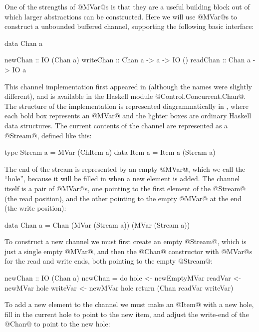 
One of the strengths of @MVar@s is that they are a useful building
block out of which larger abstractions can be constructed.  Here we
will use @MVar@s to construct a unbounded buffered channel, supporting
the following basic interface:

\begin{haskell}
data Chan a

newChan   :: IO (Chan a)
writeChan :: Chan a -> a -> IO ()
readChan  :: Chan a -> IO a
\end{haskell}

\noindent This channel implementation first appeared in
\citet{jones96concurrent} (although the names were slightly
different), and is available in the Haskell module
@Control.Concurrent.Chan@.  The structure of the implementation is
represented diagrammatically in , where each bold box
represents an @MVar@ and the lighter boxes are ordinary Haskell data
structures.  The current contents of the channel are represented as a
@Stream@, defined like this:

\begin{haskell}
type Stream a = MVar (ChItem a)
data Item a   = Item a (Stream a)
\end{haskell}

\noindent The end of the stream is represented by an empty @MVar@,
which we call the ``hole'', because it will be filled in when a new
element is added.  The channel itself is a pair of @MVar@s, one
pointing to the first element of the @Stream@ (the read position), and
the other pointing to the empty @MVar@ at the end (the write
position):

\begin{haskell}
data Chan a
 = Chan (MVar (Stream a))
        (MVar (Stream a))
\end{haskell}

To construct a new channel we must first create an empty @Stream@, which
is just a single empty @MVar@, and then the @Chan@ constructor with
@MVar@s for the read and write ends, both pointing to the empty
@Stream@:

\begin{haskell}
newChan :: IO (Chan a)
newChan = do
   hole  <- newEmptyMVar
   readVar  <- newMVar hole
   writeVar <- newMVar hole
   return (Chan readVar writeVar)
\end{haskell}

To add a new element to the channel we must make an @Item@ with a new
hole, fill in the current hole to point to the new item, and adjust
the write-end of the @Chan@ to point to the new hole:

